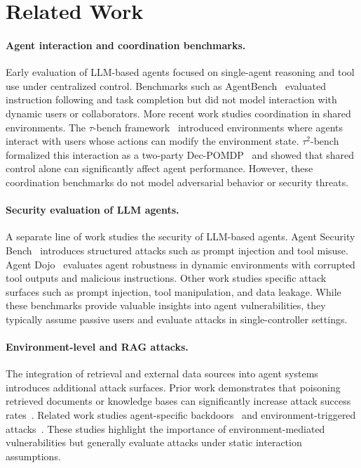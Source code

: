 \documentclass[11pt]{article}
\begin{document}
\section{Related Work}

\paragraph{Agent interaction and coordination benchmarks.}

Early evaluation of LLM-based agents focused on single-agent reasoning and tool use under centralized control. Benchmarks such as AgentBench~\cite{liu2023agentbench} evaluated instruction following and task completion but did not model interaction with dynamic users or collaborators. More recent work studies coordination in shared environments. The $\tau$-bench framework~\cite{yao2024tau} introduced environments where agents interact with users whose actions can modify the environment state. $\tau^2$-bench~\cite{barres2025tau} formalized this interaction as a two-party Dec-POMDP~\cite{amato2013decentralized} and showed that shared control alone can significantly affect agent performance. However, these coordination benchmarks do not model adversarial behavior or security threats.

\paragraph{Security evaluation of LLM agents.}

A separate line of work studies the security of LLM-based agents. Agent Security Bench~\cite{zhang2025agent} introduces structured attacks such as prompt injection and tool misuse. Agent Dojo~\cite{debenedetti2024agentdojo} evaluates agent robustness in dynamic environments with corrupted tool outputs and malicious instructions. Other work studies specific attack surfaces such as prompt injection, tool manipulation, and data leakage. While these benchmarks provide valuable insights into agent vulnerabilities, they typically assume passive users and evaluate attacks in single-controller settings.

\paragraph{Environment-level and RAG attacks.}

The integration of retrieval and external data sources into agent systems introduces additional attack surfaces. Prior work demonstrates that poisoning retrieved documents or knowledge bases can significantly increase attack success rates~\cite{zou2025poisonedrag}. Related work studies agent-specific backdoors~\cite{chen2024agentpoison} and environment-triggered attacks~\cite{wang2024badagent}. These studies highlight the importance of environment-mediated vulnerabilities but generally evaluate attacks under static interaction assumptions.
\end{document}
